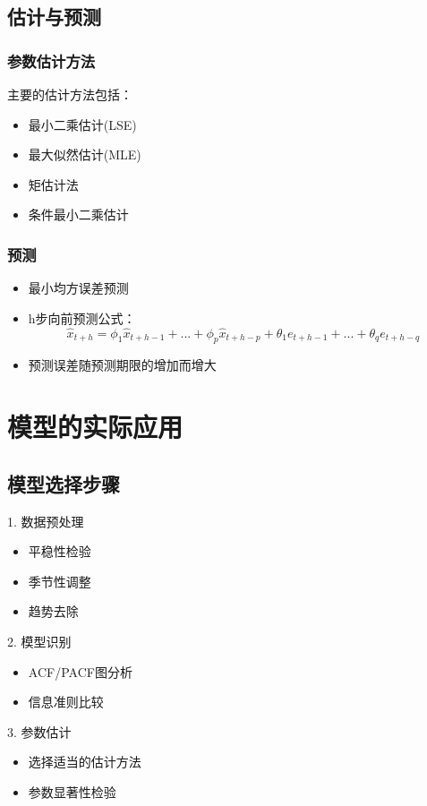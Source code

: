 \subsection{估计与预测}
\subsubsection{参数估计方法}
主要的估计方法包括：
\begin{itemize}
    \item 最小二乘估计(LSE)
    \item 最大似然估计(MLE)
    \item 矩估计法
    \item 条件最小二乘估计
\end{itemize}

\subsubsection{预测}
\begin{itemize}
    \item 最小均方误差预测
    \item h步向前预测公式：
    \[\hat{x}_{t+h} = \phi_1\hat{x}_{t+h-1} + ... + \phi_p\hat{x}_{t+h-p} + \theta_1e_{t+h-1} + ... + \theta_qe_{t+h-q}\]
    \item 预测误差随预测期限的增加而增大
\end{itemize}

\section{模型的实际应用}
\subsection{模型选择步骤}
1. 数据预处理
   \begin{itemize}
       \item 平稳性检验
       \item 季节性调整
       \item 趋势去除
   \end{itemize}

2. 模型识别
   \begin{itemize}
       \item ACF/PACF图分析
       \item 信息准则比较
   \end{itemize}

3. 参数估计
   \begin{itemize}
       \item 选择适当的估计方法
       \item 参数显著性检验
   \end{itemize}

